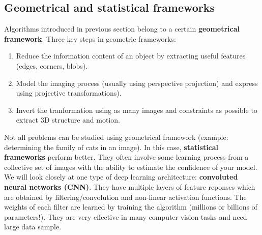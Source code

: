 \documentclass[a4paper,11pt]{article}
\begin{document}
\subsection{Geometrical and statistical frameworks}
Algorithms introduced in previous section belong to a certain \textbf{geometrical framework}. Three key steps in geometric frameworks:
\begin{enumerate}
	\item Reduce the information content of an object by extracting useful features (edges, corners, blobs).
	\item Model the imaging process (usually using perspective projection) and express using projective transformations). 
	\item Invert the tranformation using as many images and constraints as possible to extract 3D structure and motion.
\end{enumerate}
Not all problems can be studied using geometrical framework (example: determining the family of cats in an image). In this case, \textbf{statistical frameworks} perform better. They often involve some learning process from a collective set of images with the ability to estimate the confidence of your model. \\
We will look closely at one type of deep learning architecture:  \textbf{convoluted neural networks (CNN)}. They have multiple layers of feature reponses which are obtained by filtering/convolution and non-linear activation functions. The weights of each filter are learned by training the algorithm (millions or billions of parameters!). They are very effective in many computer vision tasks and need large data sample. 
	
	
	
\end{document}
